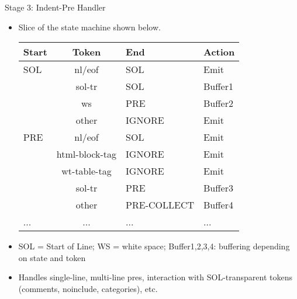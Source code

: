\documentclass[t,xcolor=dvipsnames]{beamer}
\begin{document}
\begin{frame}{Stage 3: Indent-Pre Handler}
\begin{itemize}
\small
\item Slice of the state machine shown below.
\begin{center}
\vspace{1ex}
\begin{tabular}{|l|c|l|l|} \hline
\small
{\bf Start} & {\bf Token} & {\bf End} & {\bf Action} \\ \hline
SOL & nl/eof & SOL    & Emit \\
    & sol-tr & SOL    & Buffer1 \\
    & ws     & PRE    & Buffer2 \\
    & other  & IGNORE & Emit \\ \hline
PRE & nl/eof & SOL    & Emit \\
    & html-block-tag  & IGNORE & Emit \\
    & wt-table-tag    & IGNORE & Emit \\
    & sol-tr & PRE    & Buffer3 \\
    & other  & PRE-COLLECT & Buffer4 \\ \hline
 ... & ... & ... & ... \\ \hline
\end{tabular}
\vspace{1ex}
\end{center}
\item SOL = Start of Line; WS = white space; Buffer1,2,3,4: buffering depending on state and token
\item Handles single-line, multi-line pres, interaction with SOL-transparent tokens (comments, noinclude, categories), etc.
\end{itemize}

\end{frame}

\end{document}
